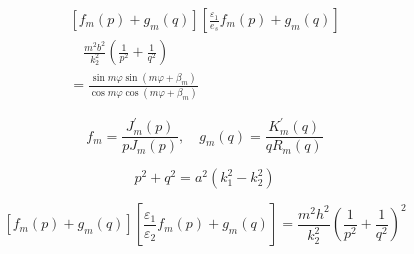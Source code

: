  
 \begin{equation}\begin{array}{c}
 {\left[f_{m}(p)+g_{m}(q)\right]\left[\frac{\varepsilon_{1}}{e_{s}} f_{m}(p)+g_{m}(q)\right]} \\
 \quad \frac{m^{2} b^{2}}{k_{2}^{2}}\left(\frac{1}{p^{2}}+\frac{1}{q^{2}}\right) \\
 =\frac{\sin m \varphi \sin \left(m \varphi+\beta_{m}\right)}{\cos m \varphi \cos \left(m \varphi+\beta_{m}\right)}
 \end{array}\end{equation}
 
 \begin{equation}f_{m}=\frac{J_{m}^{\prime}(p)}{p J_{m}(p)}, \quad g_{m}(q)=\frac{K_{m}^{\prime}(q)}{q R_{m}(q)}\end{equation}
 
 \begin{equation}p^{2}+q^{2}=a^{2}\left(k_{1}^{2}-k_{2}^{2}\right)\end{equation}
 
 
 \begin{equation}\left[f_{m}(p)+g_{m}(q)\right]\left[\frac{\varepsilon_{1}}{\varepsilon_{2}} f_{m}(p)+g_{m}(q)\right]=\frac{m^{2} h^{2}}{k_{2}^{2}}\left(\frac{1}{p^{2}}+\frac{1}{q^{2}}\right)^{2}\end{equation}
